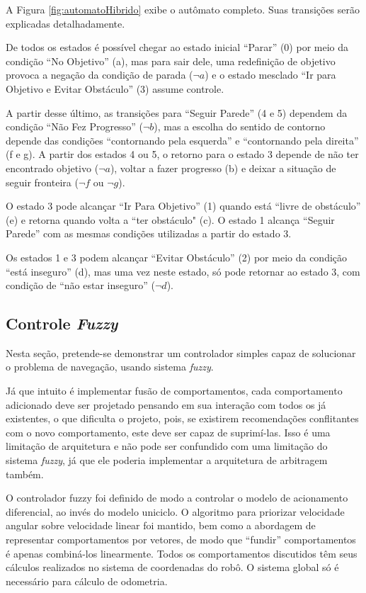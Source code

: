 		A Figura \ref{fig:automatoHibrido} exibe o autômato completo. Suas transições serão 
		explicadas detalhadamente. 
		
		
		
		De todos os estados é possível chegar ao estado inicial ``Parar'' (0) por meio da 
		condição ``No Objetivo'' (a), mas para sair dele, uma redefinição de objetivo provoca
		a negação da condição de parada ($\neg a$) e o estado mesclado ``Ir para Objetivo e 
		Evitar Obstáculo'' (3) assume controle.
		
		A partir desse último, as transições para ``Seguir Parede'' (4 e 5) dependem da condição 
		``Não Fez Progresso'' ($\neg b$), mas a escolha do sentido de contorno depende das
		condições ``contornando pela esquerda'' e ``contornando pela direita'' (f e g). A partir
		dos estados 4 ou 5, o retorno para o estado 3 depende de não ter encontrado objetivo 
		($\neg a$), voltar a fazer progresso (b) e deixar a situação de seguir fronteira 
		($\neg f$ ou $\neg g$).
		
		O estado 3 pode alcançar ``Ir Para Objetivo'' (1) quando está ``livre de obstáculo'' (e)
		e retorna quando volta a ``ter obstáculo" (c). O estado 1 alcança ``Seguir Parede'' com
		as mesmas condições utilizadas a partir do estado 3.
		
		Os estados 1 e 3 podem alcançar ``Evitar Obstáculo'' (2) por meio da condição ``está
		inseguro'' (d), mas uma vez neste estado, só pode retornar ao estado 3, com condição de
		``não estar inseguro'' ($\neg d$).
		
	\subsection{Controle \textit{Fuzzy}}
	
	Nesta seção, pretende-se demonstrar um controlador simples capaz de solucionar 
	o problema de navegação, usando sistema \textit{fuzzy}. 

	Já que intuito é implementar fusão de comportamentos, cada comportamento adicionado deve 
	ser projetado pensando em sua interação com todos os já existentes, o que dificulta o projeto,
	pois, se existirem recomendações conflitantes com o novo comportamento, este deve ser capaz 
	de suprimí-las. Isso é uma limitação de arquitetura e não pode ser confundido com uma 
	limitação do sistema \textit{fuzzy}, já que ele poderia implementar a arquitetura de 
	arbitragem também. 
	
	O controlador fuzzy foi definido de modo a controlar o modelo de acionamento diferencial,
	ao invés do modelo uniciclo. O algoritmo para priorizar velocidade angular sobre 
	velocidade linear foi mantido, bem como a abordagem de representar comportamentos por 
	vetores, de modo que ``fundir'' comportamentos é apenas combiná-los linearmente. Todos
	os comportamentos discutidos têm seus cálculos realizados no sistema de coordenadas do robô.
	O sistema global só é necessário para cálculo de odometria.
	
